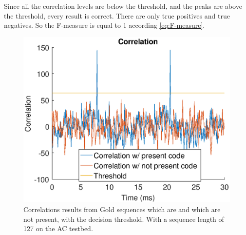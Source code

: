 Since all the correlation levels are below the threshold, and the peaks are above the threshold, every result is correct.
There are only true positives and true negatives.
So the F-measure is equal to $1$ according \autoref{eq:F-measure}.

\begin{figure}[htb]
	\centering
	\includegraphics[angle=0,width=\textwidth,keepaspectratio]{chapters/evaluation-chapters/hardware/ac/correlation-ac-testbed.eps}
	\caption{Correlations results from Gold sequences which are and which are not present, with the decision threshold. With a sequence length of 127 on the AC testbed.}
	\label{fig:correlation-ac-testbed}
\end{figure}







